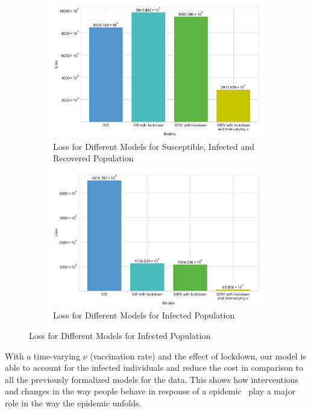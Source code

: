 \documentclass[tikz,fleqn,12pt]{wlscirep}
\begin{document}
\begin{figure}[htbp!]
	\caption{Loss for Different Models}
	\begin{subfigure}[t]{0.48\textwidth}
		\centering
		\includegraphics[width=\linewidth]{images/comparing_costs_SIR_IND.pdf}
		\caption{Loss for Different Models for Susceptible, Infected and Recovered Population}
		\label{fig:comparing_costs_SIR_IND}
	\end{subfigure}
	\hfill
	\begin{subfigure}[t]{0.48\textwidth}
		\centering
		\includegraphics[width=\linewidth]{images/comparing_costs_I_IND.pdf}
		\caption{Loss for Different Models for Infected Population}
		\label{fig:comparing_costs_I_IND}
	\end{subfigure}
\end{figure}

With a time-varying $\nu$ (vaccination rate) and the effect of lockdown, our model is able to account for the infected individuals and reduce the cost in comparison to all the previously formalized models for the data. This shows how interventions and changes in the way people behave in response of a epidemic~\cite{Caldwell2021} play a major role in the way the epidemic unfolds.
\end{document}
